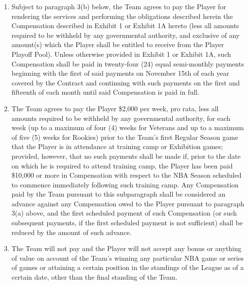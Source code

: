 \documentclass[
]{book}
\providecommand{\tightlist}{%
  \setlength{\itemsep}{0pt}\setlength{\parskip}{0pt}}
\begin{document}
\begin{enumerate}
\def\labelenumi{(\alph{enumi})}
\tightlist
\item
  Subject to paragraph 3(b) below, the Team agrees to pay the Player for rendering the services and performing the obligations described herein the Compensation described in Exhibit 1 or Exhibit 1A hereto (less all amounts required to be withheld by any governmental authority, and exclusive of any amount(s) which the Player shall be entitled to receive from the Player Playoff Pool). Unless otherwise provided in Exhibit 1 or Exhibit 1A, such Compensation shall be paid in twenty-four (24) equal semi-monthly payments beginning with the first of said payments on November 15th of each year covered by the Contract and continuing with such payments on the first and fifteenth of each month until said Compensation is paid in full.
\item
  The Team agrees to pay the Player \$2,000 per week, pro rata, less all amounts required to be withheld by any governmental authority, for each week (up to a maximum of four (4) weeks for Veterans and up to a maximum of five (5) weeks for Rookies) prior to the Team's first Regular Season game that the Player is in attendance at training camp or Exhibition games; provided, however, that no such payments shall be made if, prior to the date on which he is required to attend training camp, the Player has been paid \$10,000 or more in Compensation with respect to the NBA Season scheduled to commence immediately following such training camp. Any Compensation paid by the Team pursuant to this subparagraph shall be considered an advance against any Compensation owed to the Player pursuant to paragraph 3(a) above, and the first scheduled payment of such Compensation (or such subsequent payments, if the first scheduled payment is not sufficient) shall be reduced by the amount of such advance.
\item
  The Team will not pay and the Player will not accept any bonus or anything of value on account of the Team's winning any particular NBA game or series of games or attaining a certain position in the standings of the League as of a certain date, other than the final standing of the Team.
\end{enumerate}
\end{document}
